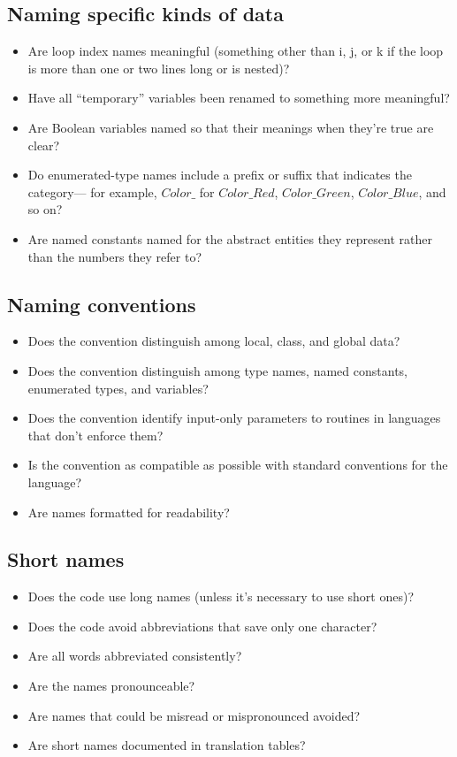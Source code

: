 \subsection{Naming specific kinds of data}
\begin{itemize}
\item Are loop index names meaningful (something other than i, j, or k if the loop is more than one or two lines long or is nested)?
\item Have all “temporary” variables been renamed to something more meaningful?
\item Are Boolean variables named so that their meanings when they’re true are clear?
\item Do enumerated-type names include a prefix or suffix that indicates the category— for example, $Color\_ $ for $Color\_Red$, $Color\_Green$, $Color\_Blue$, and so on?
\item Are named constants named for the abstract entities they represent rather than the numbers they refer to?
\end{itemize}

\subsection{Naming conventions}
\begin{itemize}
\item Does the convention distinguish among local, class, and global data?
\item Does the convention distinguish among type names, named constants, enumerated types, and variables?
\item Does the convention identify input-only parameters to routines in languages that don’t enforce them?
\item Is the convention as compatible as possible with standard conventions for the language?
\item Are names formatted for readability?
\end{itemize}

\subsection{Short names}
\begin{itemize}
\item Does the code use long names (unless it’s necessary to use short ones)?
\item Does the code avoid abbreviations that save only one character?
\item Are all words abbreviated consistently?
\item Are the names pronounceable?
\item Are names that could be misread or mispronounced avoided?
\item Are short names documented in translation tables?
\end{itemize}

